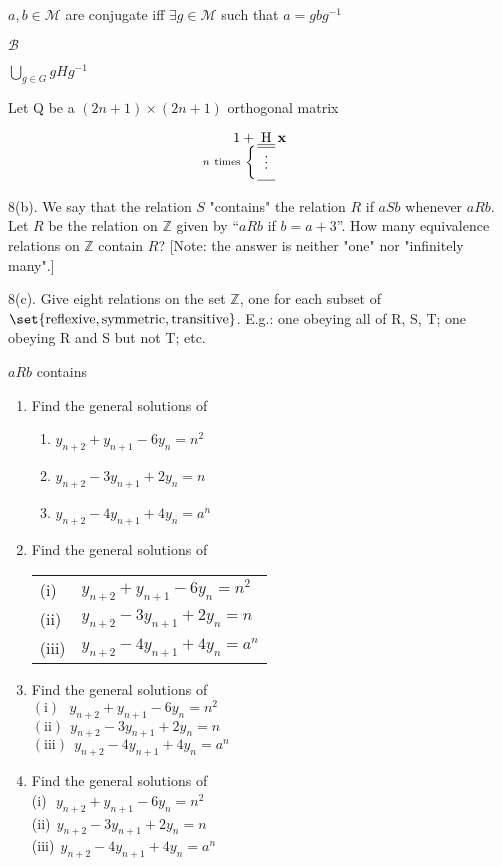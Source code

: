 \documentclass[12pt,fleqn,a4paper]{article}
\newcommand*\tensordim[2]{
 \underset{
  \mathllap{#2\ \text{times}
  \ \left\{
   \vphantom{
    \begin{array}{c}
     \hline \hline \vdots \\[1ex] \hline
    \end{array}
   } \right.
  }
  \begin{array}{c}
   \hline \hline \vdots \\[1ex] \hline
  \end{array}
 }
 {\mathrm #1}
}
\begin{document}
\(a, b \in \mathcal M\) are conjugate iff \(\mathop\exists g \in \mathcal M\) such that \(a = g b g^{-1}\)

\(\mathscr B\)

\(\bigcup\limits_{g \in G} g H g^{-1}\)

Let Q be a \((2n+1)\times(2n+1)\) orthogonal matrix

\begin{equation*}
 1 + \tensordim{H}{n} \,\mathbf x
\end{equation*}

8(b). We say that the relation \(S\) "contains" the relation \(R\) if \(aSb\)
whenever \(aRb\).  Let \(R\) be the relation on \(\mathbb Z\) given by ``\(aRb\)
if \(b = a + 3\)''.  How many equivalence relations on \(\mathbb Z\) contain
\(R\)?  [Note: the answer is neither "one" nor "infinitely many".]

8(c). Give eight relations on the set \(\mathbb Z\), one for each subset of
\(\set{\text{reflexive}, \text{symmetric}, \text{transitive}}\).  E.g.: one
obeying all of R, S, T; one obeying R and S but not T; etc.


\(a R b\) contains

\begin{enumerate}
 \item Find the general solutions of
\begin{enumerate}[label=(\roman*)]
 \item \(y_{n + 2} + y_{n + 1} - 6 y_n = n^2\)
 \item \(y_{n + 2} - 3 y_{n + 1} + 2 y_n = n\)
 \item \(y_{n + 2} - 4 y_{n + 1} + 4 y_n = a^n\)
\end{enumerate}

\item Find the general solutions of \\
\begin{tabular}{ll}
  (i) & \(y_{n + 2} + y_{n + 1} - 6 y_n = n^2\) \\
 (ii) & \(y_{n + 2} - 3 y_{n + 1} + 2 y_n = n\) \\
(iii) & \(y_{n + 2} - 4 y_{n + 1} + 4 y_n = a^n\) \\
\end{tabular}

\item Find the general solutions of \\
\(  (\mathrm{i})\ \ \  y_{n + 2} + y_{n + 1} - 6 y_n = n^2\) \\
\( (\mathrm{ii})\ \  y_{n + 2} - 3 y_{n + 1} + 2 y_n = n\) \\
\((\mathrm{iii})\ \ y_{n + 2} - 4 y_{n + 1} + 4 y_n = a^n\)

\item Find the general solutions of \\
 (i)\(\ \ \  y_{n + 2} + y_{n + 1} - 6 y_n = n^2\) \\
 (ii)\(\ \  y_{n + 2} - 3 y_{n + 1} + 2 y_n = n\) \\
 (iii)\(\ \  y_{n + 2} - 4 y_{n + 1} + 4 y_n = a^n\)
\end{enumerate}
\end{document}
